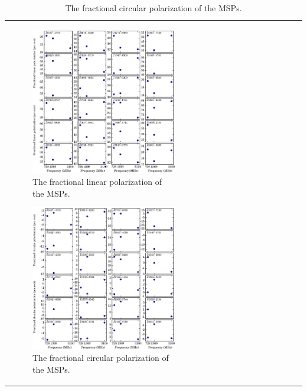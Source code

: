 \documentclass[useAMS,usenatbib]{mn2e}
\begin{document}
\begin{table}
\begin{center}
\begin{tabular}{lcccccccccccc}
\begin{figure}
\begin{center}
\includegraphics[width=6 in]{linear.ps}
\caption{The fractional linear polarization of the MSPs.} 
\label{linear}
\end{center}
\end{figure}

\begin{figure}
\begin{center}
\includegraphics[width=6 in]{circular.ps}
\caption{The fractional circular polarization of the MSPs.} 
\label{circular}
\end{center}
\end{figure}


\end{tabular}
\end{center}
\end{table}
\end{document}
